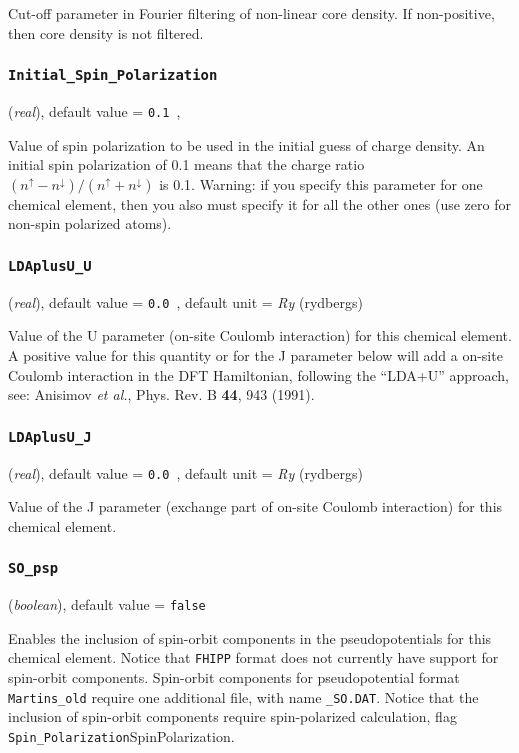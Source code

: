 \documentclass{article}
\begin{document}
Cut-off parameter in Fourier filtering of non-linear core density. If
non-positive, then core density is not filtered.

\subsubsection{\tt Initial\_Spin\_Polarization
\label{InitialSpinPolarization}}
({\it real}),
default value = {\tt 0.1 },

Value of spin polarization to be used in the initial guess of charge
density. An initial spin polarization of 0.1 means that the charge
ratio $( n^\uparrow - n^\downarrow )/( n^\uparrow + n^\downarrow )$ is
0.1. Warning: if you specify this parameter for one chemical element,
then you also must specify it for all the other ones (use zero for
non-spin polarized atoms).

\subsubsection{\tt LDAplusU\_U 
\label{LDAplusUU}}
({\it real}),
default value = {\tt 0.0 },
default unit = {\it Ry} (rydbergs)

Value of the U parameter (on-site Coulomb interaction) for this
chemical element. A positive value for this quantity or for the J
parameter below will add a on-site Coulomb interaction in the DFT
Hamiltonian, following the ``LDA+U'' approach, see: Anisimov {\it et
  al.}, Phys. Rev. B {\bf 44}, 943 (1991).

\subsubsection{\tt LDAplusU\_J 
\label{LDAplusUJ}}
({\it real}),
default value = {\tt 0.0 },
default unit = {\it Ry} (rydbergs)

Value of the J parameter (exchange part of on-site Coulomb
interaction) for this chemical element.

\subsubsection{\tt SO\_psp 
\label{SOpsp}}
({\it boolean}),
default value = {\tt false }

Enables the inclusion of spin-orbit components in the
pseudopotentials for this chemical element. Notice that {\tt FHIPP}
format does not currently have support for spin-orbit
components. Spin-orbit components for pseudopotential format
{\tt Martins\_old} require one additional file, with name
{\tt *\_SO.DAT}. Notice that the inclusion of spin-orbit components
require spin-polarized calculation, flag
{\tt Spin\_Polarization}{SpinPolarization}.
\end{document}
